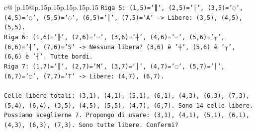 \documentclass{article}
\begin{document}
{\begin{supertabular}{c@{$\;$}|p{.15\linewidth}@{}p{.15\linewidth}p{.15\linewidth}p{.15\linewidth}p{.15\linewidth}p{.15\linewidth}}
{{{\texttt{Riga 5: (1,5)='║', (2,5)='│', (3,5)='◌', (4,5)='◌', (5,5)='◌', (6,5)='│', (7,5)='A' {-}> Libere: (3,5), (4,5), (5,5).} \\
\texttt{Riga 6: (1,6)='╟', (2,6)='─', (3,6)='┼', (4,6)='─', (5,6)='┬', (6,6)='┤', (7,6)='S' {-}> Nessuna libera? (3,6) è '┼', (5,6) è '┬', (6,6) è '┤'. Tutte bordi.} \\
\texttt{Riga 7: (1,7)='║', (2,7)='M', (3,7)='│', (4,7)='◌', (5,7)='│', (6,7)='◌', (7,7)='T' {-}> Libere: (4,7), (6,7).} \\
\\ 
\texttt{Celle libere totali: (3,1), (4,1), (5,1), (6,1), (4,3), (6,3), (7,3), (5,4), (6,4), (3,5), (4,5), (5,5), (4,7), (6,7). Sono 14 celle libere. Possiamo sceglierne 7. Propongo di usare: (3,1), (4,1), (5,1), (6,1), (4,3), (6,3), (7,3). Sono tutte libere. Confermi?} \\
            }
        }
    }
     \\ \\


\end{supertabular}}
\end{document}

